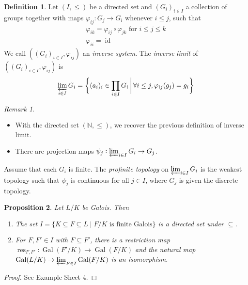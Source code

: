 \documentclass[11pt]{article}
\theoremstyle{definition}
\newtheorem{definition}{Definition}[subsection]
\theoremstyle{plain}
\newtheorem{proposition}[definition]{Proposition}
\theoremstyle{remark}
\newtheorem*{remark}{Remark}
\DeclareMathOperator{\Gal}{Gal}
\DeclareMathOperator{\res}{res}
\DeclareMathOperator{\id}{id}
\newcommand{\NN}{\mathbb{N}}
\begin{document}
\begin{definition}\label{def:16_2}
    Let $(I, \le)$ be a directed set and $(G_i)_{i \in I}$ a collection of groups together with maps $\varphi_{ij} : G_j \to G_i$ whenever $i \le j$, such that
    \begin{gather*}
        \varphi_{ik} = \varphi_{ij} \circ \varphi_{jk} \text{ for } i \le j \le k\\
        \varphi_{ii} = \id
    \end{gather*}
    We call $((G_i)_{i \in I}, \varphi_{ij})$ an \emph{inverse system}. The \emph{inverse limit} of $((G_i)_{i \in I}, \varphi_{ij})$ is
    \begin{equation*}
        \varprojlim_{i \in I} G_i = \bigg\{(a_i)_i \in \prod_{i \in I} G_i \,\bigg\vert\, \forall i \le j, \varphi_{ij}(g_j) = g_i\bigg\}
    \end{equation*}
\end{definition}

\begin{remark}\phantom{}
    \begin{itemize}
        \item With the directed set $(\NN, \le)$, we recover the previous definition of inverse limit.
        \item There are projection maps $\psi_j : \varprojlim_{i \in I} G_i \to G_j$.
    \end{itemize}
\end{remark}

Assume that each $G_i$ is finite. The \emph{profinite topology} on $\varprojlim_{i \in I} G_i$ is the weakest topology such that $\psi_j$ is continuous for all $j \in I$, where $G_j$ is given the discrete topology.

\begin{proposition}\label{prop:16_3}
    Let $L/K$ be Galois. Then
    \begin{enumerate}
        \item The set $I = \{K \subseteq F \subseteq L \mid F/K \text{ is finite Galois}\}$ is a directed set under $\subseteq$.
        \item For $F, F' \in I$ with $F \subseteq F'$, there is a restriction map $\res_{F,F'} : \Gal(F'/K) \to \Gal(F/K)$ and the natural map $\Gal(L/K) \to \varprojlim_{F \in I} \Gal(F/K)$ is an isomorphism.
    \end{enumerate}
\end{proposition}
\begin{proof}
    See Example Sheet 4.
\end{proof}
\end{document}
